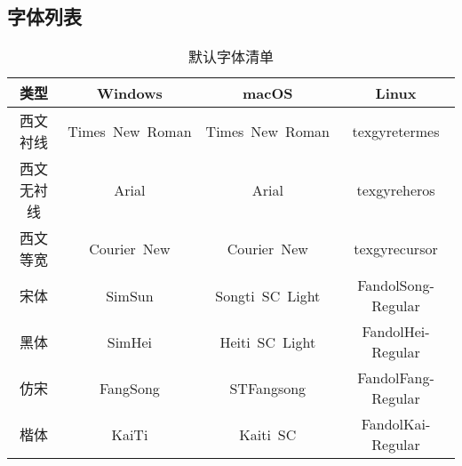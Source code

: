 \subsection{字体列表}

\begin{table}[htbp]
    \caption{默认字体清单}
    \label{tab:fontset}
    \begin{tabular}{cccc}
        \toprule
        类型 & Windows & macOS & Linux \\
        \midrule
        西文衬线 & Times~New~Roman & Times~New~Roman & texgyretermes \\
        西文无衬线 & Arial & Arial & texgyreheros \\
        西文等宽 & Courier~New & Courier~New & texgyrecursor \\
        宋体 & SimSun & Songti~SC~Light &FandolSong-Regular \\
        黑体 & SimHei & Heiti~SC~Light & FandolHei-Regular \\
        仿宋 & FangSong & STFangsong & FandolFang-Regular \\
        楷体 & KaiTi & Kaiti~SC & FandolKai-Regular \\
        \bottomrule
    \end{tabular}
\end{table}
